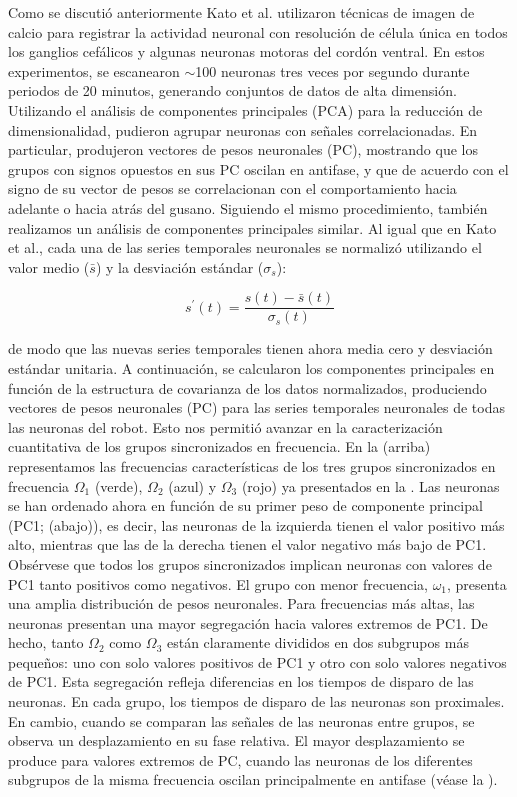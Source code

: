 Como se discutió anteriormente Kato et al. \cite{kato_global_2015} utilizaron técnicas de imagen de calcio para registrar la actividad neuronal con resolución de célula única en todos los ganglios cefálicos y algunas neuronas motoras del cordón ventral. En estos experimentos, se escanearon $\sim$100 neuronas tres veces por segundo durante periodos de 20 minutos, generando conjuntos de datos de alta dimensión. Utilizando el análisis de componentes principales (PCA) para la reducción de dimensionalidad, pudieron agrupar neuronas con señales correlacionadas. En particular, produjeron vectores de pesos neuronales (PC), mostrando que los grupos con signos opuestos en sus PC oscilan en antifase, y que de acuerdo con el signo de su vector de pesos se correlacionan con el comportamiento hacia adelante o hacia atrás del gusano.   Siguiendo el mismo procedimiento, también realizamos un análisis de componentes principales similar. Al igual que en Kato et al., cada una de las series temporales neuronales se normalizó utilizando el valor medio ($\bar{s}$) y la desviación estándar ($\sigma_s$):

\begin{equation}
s^{\prime}(t)=\frac{s(t)-\bar{s}(t)}{\sigma_s(t)}
\end{equation}


de modo que las nuevas series temporales tienen ahora media cero y desviación estándar unitaria. A continuación, se calcularon los componentes principales en función de la estructura de covarianza de los datos normalizados, produciendo vectores de pesos neuronales (PC) para las series temporales neuronales de todas las neuronas del robot. Esto nos permitió avanzar en la caracterización cuantitativa de los grupos sincronizados en frecuencia.  En la  (arriba) representamos las frecuencias características de los tres grupos sincronizados en frecuencia $\Omega_1$ (verde), $\Omega_2$ (azul) y $\Omega_3$ (rojo) ya presentados en la . Las neuronas se han ordenado ahora en función de su primer peso de componente principal (PC1;  (abajo)), es decir, las neuronas de la izquierda tienen el valor positivo más alto, mientras que las de la derecha tienen el valor negativo más bajo de PC1. Obsérvese que todos los grupos sincronizados implican neuronas con valores de PC1 tanto positivos como negativos. El grupo con menor frecuencia, $\omega_1$, presenta una amplia distribución de pesos neuronales. Para frecuencias más altas, las neuronas presentan una mayor segregación hacia valores extremos de PC1. De hecho, tanto $\Omega_2$ como $\Omega_3$ están claramente divididos en dos subgrupos más pequeños: uno con solo valores positivos de PC1 y otro con solo valores negativos de PC1. Esta segregación refleja diferencias en los tiempos de disparo de las neuronas. En cada grupo, los tiempos de disparo de las neuronas son proximales. En cambio, cuando se comparan las señales de las neuronas entre grupos, se observa un desplazamiento en su fase relativa. El mayor desplazamiento se produce para valores extremos de PC, cuando las neuronas de los diferentes subgrupos de la misma frecuencia oscilan principalmente en antifase (véase la ).

